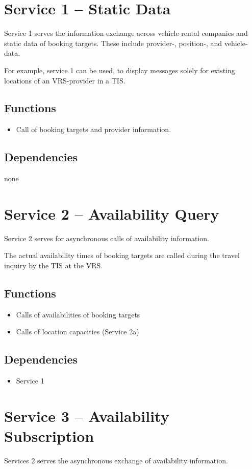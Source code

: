 \section{Service 1 -- Static Data}
\label{sec:Hierachiemodell:Dienst1}
Service 1 serves the information exchange across vehicle rental companies and static data of booking targets. These include provider-, position-, and vehicle-data. 

For example, service 1 can be used, to display messages solely for existing locations of an VRS-provider in a TIS. 
\subsection*{Functions}
\begin{itemize}
\item Call of booking targets and provider information.
\end{itemize}

\subsection*{Dependencies}
none

\section{Service 2 -- Availability Query}
\label{sec:Hierachiemodell:Dienst2}
Service 2 serves for asynchronous calls of availability information.

The actual availability times of booking targets are called during the travel inquiry by the TIS at the VRS.
\subsection*{Functions}
\begin{itemize}
\item Calls of availabilities of booking targets
\item Calls of location capacities (Service 2a)
\end{itemize}

\subsection*{Dependencies}
\begin{itemize}
\item Service 1
\end{itemize}

\section{Service 3 -- Availability Subscription}
\label{sec:Hierachiemodell:Dienst3}
Services 2 serves the asynchronous exchange of availability information.

